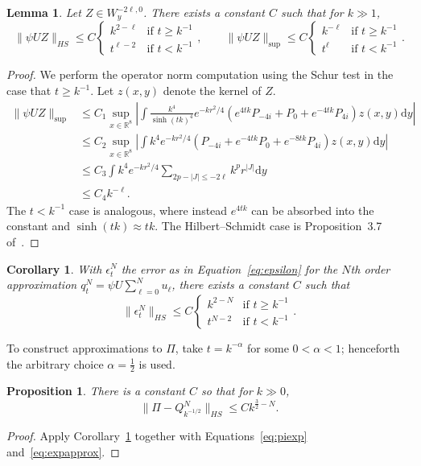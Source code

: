 \documentclass{article}
\newcommand{\di}{\mathrm{d}}
\newcommand{\real}{\mathbb{R}}
\newcommand{\inv}{^{-1}}
\newtheorem{lemma}[theorem]{Lemma}
\newtheorem{proposition}[theorem]{Proposition}
\newtheorem{corollary}[theorem]{Corollary}
\theoremstyle{definition}
\theoremstyle{remark}
\begin{document}
\begin{lemma}
    \label{lem:hswt}
    Let $Z \in W^{-2\ell,0}_y$.
    There exists a constant $C$ such that for $k \gg 1$,
    \[
        \| \psi U Z\|_{HS} \le C\begin{cases} k^{2-\ell} & \text{if $t \ge k\inv$} \\ t^{\ell-2} &\text{if $t < k\inv$} \end{cases}, \qquad \|\psi U Z \|_{\sup} \le C \begin{cases} k^{-\ell} & \text{if $t \ge k\inv$} \\ t^{\ell} & \text{if $t < k\inv$} \end{cases}.
    \]
\end{lemma}
\begin{proof}
    We perform the operator norm computation using the Schur test in the case that $t \ge k\inv$.
    Let $z(x,y)$ denote the kernel of $Z$.
    \begin{align*}
        \|\psi U Z\|_{\sup} &\le C_1\sup_{x \in \real^8} \left|\int \frac{k^4}{\sinh(tk)^4} e^{-kr^2/4}(e^{4tk} P_{-4i} + P_0 + e^{-4tk} P_{4i} ) z(x,y) \di y\right| \\
                            &\le C_2\sup_{x \in \real^8} \left|\int k^4 e^{-kr^2/4}(P_{-4i} + e^{-4tk} P_0 + e^{-8tk} P_{4i} ) z(x,y) \di y\right| \\
                            &\le C_3\int k^4 e^{-kr^2/4} \sum_{2p - |J| \le -2\ell} k^{p} r^{|J|} \di y \\
                            &\le C_4 k^{-\ell}.
    \end{align*}
    The $t < k\inv$ case is analogous, where instead $e^{4tk}$ can be absorbed into the constant and $\sinh(tk) \approx tk$.
    The Hilbert--Schmidt case is Proposition~3.7 of~\cite{charbonneauAsymptoticHodgeTheory2015}.
\end{proof}

\begin{corollary}
    \label{cor:epshs}
    With $\epsilon^N_t$ the error as in Equation~\eqref{eq:epsilon} for the $N$th order approximation $q^N_t = \psi U \sum_{\ell=0}^N u_\ell$, there exists a constant $C$ such that
    \[
        \| \epsilon^N_{t} \|_{HS} \le C \begin{cases} k^{2 - N} & \text{if $t \ge k\inv$} \\ t^{N-2} & \text{if $t < k\inv$} \end{cases}.
    \]
\end{corollary}

To construct approximations to $\Pi$, take $t = k^{-\alpha}$ for some $0 < \alpha < 1$; henceforth the arbitrary choice $\alpha = \frac{1}{2}$ is used.
\begin{proposition}
    \label{prop:goodapp}
    There is a constant $C$ so that for $k \gg 0$,
    \[
        \| \Pi - Q^N_{k^{-1/2}}\|_{HS} \le C k^{\frac{3}{2}-N}.
    \]
\end{proposition}
\begin{proof}
    Apply Corollary~\ref{cor:epshs} together with Equations~\eqref{eq:piexp} and~\eqref{eq:expapprox}.
\end{proof}
\end{document}
